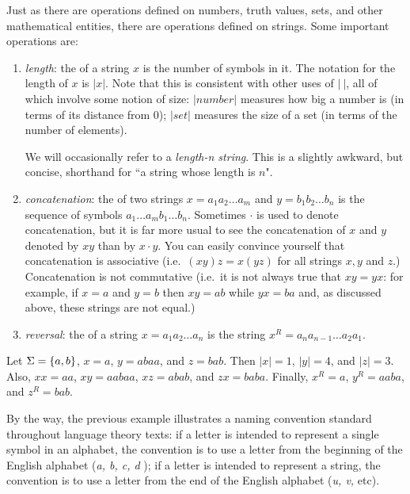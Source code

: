Just as there are operations defined on numbers, truth values, sets,
and other mathematical entities, there are operations defined on
strings.  Some important operations are:
\begin{enumerate}
\item {\em length}: the  of a string $x$ is the number of symbols
in it.  The notation for the length of $x$ is $|x|$.  Note that
this is consistent with other uses of $|\ |$, all of which 
involve some notion of size: $|number|$ measures how big a number
is (in terms of its distance from 0);  $|set|$ measures the size
of a set (in terms of the number of elements).

We will occasionally refer to a {\em length-n string}.  This is a
slightly awkward, but concise, shorthand for ``a string whose length
is $n$".

\item {\em concatenation}: the  of two strings $x=a_1
a_2\ldots a_m$ and $y=b_1b_2\ldots b_n$ is the sequence of symbols
$a_1\ldots a_mb_1\ldots b_n$.  Sometimes $\cdot$ is used to denote
concatenation, but it is far more usual to see the concatenation of 
$x$ and $y$ denoted by $xy$ than by $x\cdot y$.  You can easily
convince yourself that concatenation is associative (i.e.\ $(xy)z =
x(yz)$ for all strings $x,y$ and $z$.)  Concatenation is not
commutative (i.e.\ it is not always true that $xy = yx$:
for example, if $x=a$ and $y=b$ then $xy=ab$ while $yx=ba$ and, as
discussed above, these strings are not equal.)

\item {\em reversal}: the  of a string $x=a_1a_2\ldots a_n$ is
the string $x^R = a_na_{n-1}\ldots a_2a_1$.
\end{enumerate}

\begin{example}Let $\Sigma = \mbox{$\{a,b\}$}$, $x=a$, $y=abaa$, and $z=bab$.
Then $|x| = 1$, $|y| = 4$, and $|z|=3$.  Also, $xx = aa$, $xy =
aabaa$, $xz = abab$, and $zx = baba$.  Finally, $x^R = a$,
$y^R = aaba$, and $z^R=bab$.
\end{example}

\smallskip

By the way, the previous example illustrates a naming convention standard
throughout language theory texts: if a letter is
intended to represent a single symbol in an alphabet, the convention
is to use a letter from the beginning of the English alphabet ({\em a,
b, c, d }); if a letter is intended to represent a string, the 
convention is to use a letter from the end of the English alphabet
({\em u, v, } etc).

